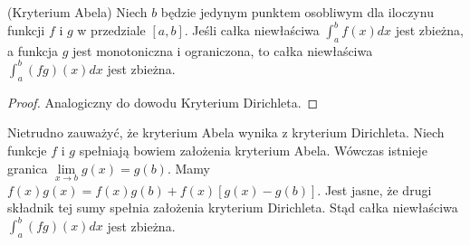 \documentclass[leqno]{article}
\begin{document}
\begin{justify}
\begin{theorem}
{
    (Kryterium Abela) Niech $b$ będzie jedynym punktem osobliwym dla iloczynu funkcji $f$ i $g$ w przedziale $[a,b]$.
    Jeśli całka niewłaściwa $\int_{a}^{b}f(x)dx$ jest zbieżna, a funkcja $g$ jest monotoniczna i ograniczona, to całka niewłaściwa
    $\int_{a}^{b}(fg)(x)dx$ jest zbieżna.
}
\end{theorem}

\begin{proof}
    Analogiczny do dowodu Kryterium Dirichleta.
\end{proof}

\begin{uwaga}
    Nietrudno zauważyć, że kryterium Abela wynika z kryterium Dirichleta.
    Niech funkcje $f$ i $g$ spełniają bowiem założenia kryterium Abela. Wówczas istnieje granica
    $\lim\limits_{x \to b}g(x) = g(b)$. Mamy $f(x)g(x) = f(x)g(b) + f(x)[g(x) - g(b)]$. Jest jasne, że drugi składnik tej sumy
    spełnia założenia kryterium Dirichleta. Stąd całka niewłaściwa $\int_{a}^{b}(fg)(x)dx$ jest zbieżna. 
\end{uwaga}

\end{justify}
\end{document}
